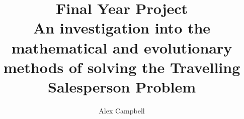 \documentclass[12pt,a4paper,titlepage]{article}
\title{Final Year Project\\[1em]
\large An investigation into the mathematical and evolutionary methods of solving the Travelling Salesperson Problem}
\author{Alex Campbell}
\date{}
\begin{document}
\maketitle

\begin{appendices}

\end{appendices}

\begin{thebibliography}[1]

\end{thebibliography}
\end{document}
